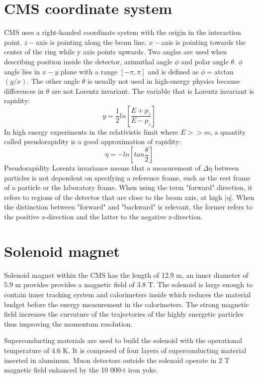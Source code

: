 
\section{CMS coordinate system}

CMS uses a right-handed coordinate system with the origin in the interaction point. $z-$axis is pointing along the beam line. $x-$axis is pointing towards the center of the ring while y axis points upwards. Two angles are used when describing position inside the detector, azimuthal angle $\phi$ and polar angle $\theta$. $\phi$ angle lies in $x-y$ plane with a range $[-\pi,\pi]$  and is defined as $\phi=$atctan$(y/x)$. The other angle $\theta$ is usually not used in high-energy physics because differences in $\theta$ are not Lorentz invariant.
The variable that is Lorentz invariant is rapidity:
\begin{equation}
y=\frac{1}{2}ln\left[ \frac{E+p_z}{E-p_z}\right]
\end{equation}
In high energy experiments in the relativistic limit where $E>>m$, a quantity called pseudorapidity is a good approximation of rapidity:
\begin{equation}
\eta = -ln \left[ tan \frac{\theta}{2} \right]
\end{equation}
Pseudorapidity Lorentz invariance means that a measurement of $\Delta\eta$ between particles is not dependent on specifying a reference frame, such as the rest frame of a particle or the laboratory frame. When using the term "forward" direction, it refers to regions of the detector that are close to the beam axis, at high |$\eta$|. When the distinction between "forward" and "backward" is relevant, the former refers to the positive z-direction and the latter to the negative z-direction.


\section{Solenoid magnet}

Solenoid magnet within the CMS has the length of 12.9 m, an inner diameter of 5.9 m provides provides a magnetic field of 3.8 T. The solenoid is large enough to contain inner tracking system and calorimeters inside which reduces the material budget before the energy measurement in the calorimeters. The strong magnetic field increases the curvature of the trajectories of the highly energetic particles thus improving the momentum resolution.
\par Superconducting materials are used to build the solenoid with the operational temperature of 4.6 K. It is composed of four layers of superconducting material inserted in aluminum. Muon detectors outside the solenoid operate in 2 T magnetic field enhanced by the 10 000-t iron yoke.  

